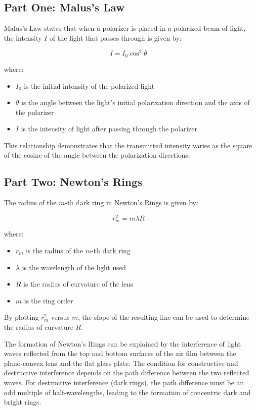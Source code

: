 \documentclass[journal]{IEEEtran}
\begin{document}
\subsection{Part One: Malus's Law}
Malus's Law states that when a polarizer is placed in a polarized beam of light, the intensity $I$ of the light that passes through is given by:

\begin{equation}
    I = I_0\cos^2\theta
    \label{eq:malus}
\end{equation}

where:
\begin{itemize}
    \item $I_0$ is the initial intensity of the polarized light
    \item $\theta$ is the angle between the light's initial polarization direction and the axis of the polarizer
    \item $I$ is the intensity of light after passing through the polarizer
\end{itemize}

This relationship demonstrates that the transmitted intensity varies as the square of the cosine of the angle between the polarization directions.

\subsection{Part Two: Newton's Rings}
The radius of the $m$-th dark ring in Newton's Rings is given by:

\begin{equation}
    r_m^2 = m \lambda R
    \label{eq:newtons_rings}
\end{equation}

where:
\begin{itemize}
    \item $r_m$ is the radius of the $m$-th dark ring
    \item $\lambda$ is the wavelength of the light used
    \item $R$ is the radius of curvature of the lens
    \item $m$ is the ring order
\end{itemize}
By plotting $r_m^2$ versus $m$, the slope of the resulting line can be used to determine the radius of curvature $R$.

The formation of Newton's Rings can be explained by the interference of light waves reflected from the top and bottom surfaces of the air film between the plano-convex lens and the flat glass plate. The condition for constructive and destructive interference depends on the path difference between the two reflected waves. For destructive interference (dark rings), the path difference must be an odd multiple of half-wavelengths, leading to the formation of concentric dark and bright rings.
\end{document}
